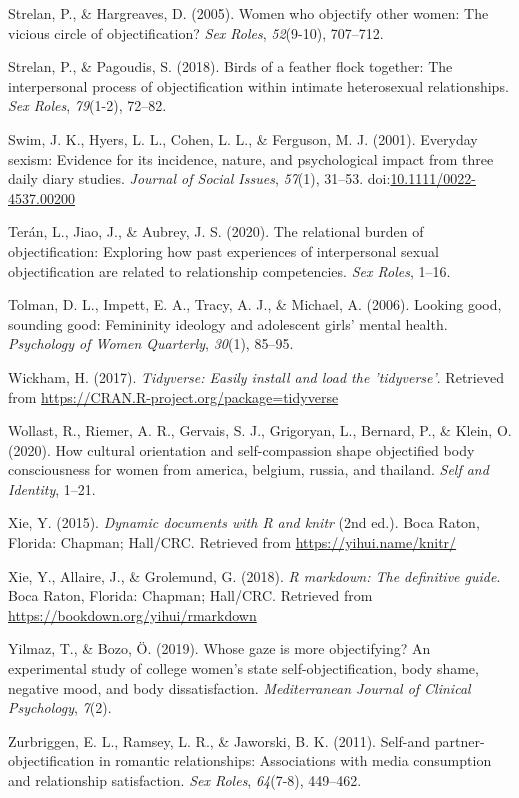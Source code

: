 \documentclass[man]{apa6}
\begin{document}
\hypertarget{ref-strelan2005women}{}
Strelan, P., \& Hargreaves, D. (2005). Women who objectify other women:
The vicious circle of objectification? \emph{Sex Roles},
\emph{52}(9-10), 707--712.

\hypertarget{ref-strelan2018birds}{}
Strelan, P., \& Pagoudis, S. (2018). Birds of a feather flock together:
The interpersonal process of objectification within intimate
heterosexual relationships. \emph{Sex Roles}, \emph{79}(1-2), 72--82.

\hypertarget{ref-swimetal}{}
Swim, J. K., Hyers, L. L., Cohen, L. L., \& Ferguson, M. J. (2001).
Everyday sexism: Evidence for its incidence, nature, and psychological
impact from three daily diary studies. \emph{Journal of Social Issues},
\emph{57}(1), 31--53.
doi:\href{https://doi.org/10.1111/0022-4537.00200}{10.1111/0022-4537.00200}

\hypertarget{ref-teran2020relational}{}
Terán, L., Jiao, J., \& Aubrey, J. S. (2020). The relational burden of
objectification: Exploring how past experiences of interpersonal sexual
objectification are related to relationship competencies. \emph{Sex
Roles}, 1--16.

\hypertarget{ref-tolman2006looking}{}
Tolman, D. L., Impett, E. A., Tracy, A. J., \& Michael, A. (2006).
Looking good, sounding good: Femininity ideology and adolescent girls'
mental health. \emph{Psychology of Women Quarterly}, \emph{30}(1),
85--95.

\hypertarget{ref-R-tidyverse}{}
Wickham, H. (2017). \emph{Tidyverse: Easily install and load the
'tidyverse'}. Retrieved from
\url{https://CRAN.R-project.org/package=tidyverse}

\hypertarget{ref-wollast2020cultural}{}
Wollast, R., Riemer, A. R., Gervais, S. J., Grigoryan, L., Bernard, P.,
\& Klein, O. (2020). How cultural orientation and self-compassion shape
objectified body consciousness for women from america, belgium, russia,
and thailand. \emph{Self and Identity}, 1--21.

\hypertarget{ref-R-knitr}{}
Xie, Y. (2015). \emph{Dynamic documents with R and knitr} (2nd ed.).
Boca Raton, Florida: Chapman; Hall/CRC. Retrieved from
\url{https://yihui.name/knitr/}

\hypertarget{ref-R-rmarkdown}{}
Xie, Y., Allaire, J., \& Grolemund, G. (2018). \emph{R markdown: The
definitive guide}. Boca Raton, Florida: Chapman; Hall/CRC. Retrieved
from \url{https://bookdown.org/yihui/rmarkdown}

\hypertarget{ref-yilmaz2019whose}{}
Yilmaz, T., \& Bozo, Ö. (2019). Whose gaze is more objectifying? An
experimental study of college women's state self-objectification, body
shame, negative mood, and body dissatisfaction. \emph{Mediterranean
Journal of Clinical Psychology}, \emph{7}(2).

\hypertarget{ref-zurbriggen2011self}{}
Zurbriggen, E. L., Ramsey, L. R., \& Jaworski, B. K. (2011). Self-and
partner-objectification in romantic relationships: Associations with
media consumption and relationship satisfaction. \emph{Sex Roles},
\emph{64}(7-8), 449--462.

\endgroup
\end{document}

